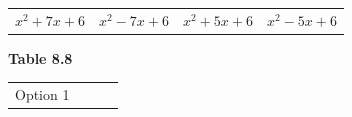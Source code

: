 {{\begin{center}
\begin{tabular}[t]{|l|l|l|l|}
     \tabularnewline\cline{1-1}\cline{2-2}\cline{3-3}\cline{4-4}
                ${x}^{2}+7x+6$
               &
                ${x}^{2}-7x+6$
               &
                \uline{
                  ${x}^{2}+5x+6$
                }
               &
                ${x}^{2}-5x+6$
     \tabularnewline\cline{1-1}\cline{2-2}\cline{3-3}\cline{4-4}
    \end{tabular}
      \end{center}
    \begin{center}{\small\bfseries Table 8.8}\end{center}
          }{ %
        \begin{center}
      \label{m39394*id276265}
    \noindent
      \tablelasttail{}
      \begin{xtabular}[t]{|l|l|l|l|}\hline
        Option 1 &

\end{xtabular}
\end{center}}}

